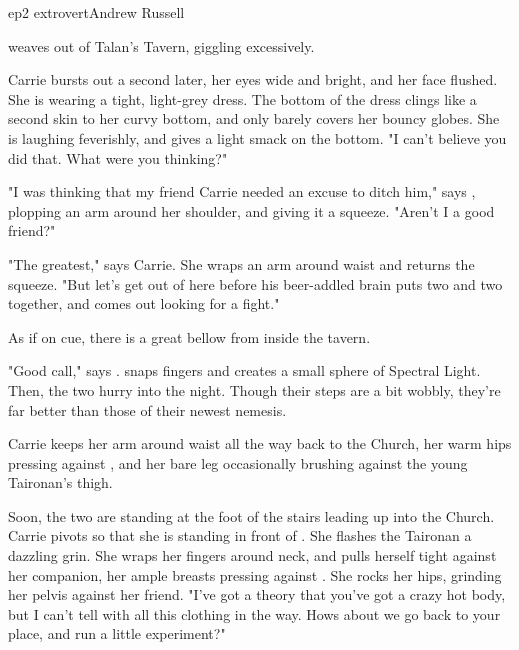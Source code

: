 \documentclass{book}
\begin{document}
\begin{childnode}{ep2 extrovert}{Andrew Russell}

    \name{} weaves out of Talan's Tavern, giggling excessively. 

    Carrie bursts out a second later, her eyes wide and bright, and her face flushed. She is wearing a tight, light-grey dress. The bottom of the dress clings like a second 
    skin to her curvy bottom, and only barely covers her bouncy globes. She is laughing feverishly, and gives \name{} a light smack on the bottom. "I can't believe you did that. What were you thinking?"

    "I was thinking that my friend Carrie needed an excuse to ditch him," says \name{}, plopping an arm around her shoulder, and giving it a squeeze. "Aren't I a good friend?"

    "The greatest," says Carrie. She wraps an arm around \names{} waist and returns the squeeze. "But let's get out of here before his beer-addled brain puts two and two together, and comes out 
    looking for a fight."

    As if on cue, there is a great bellow from inside the tavern.

    "Good call," says \name{}. \HeShe{} snaps \hisher{} fingers and creates a small sphere of Spectral Light.  Then, the two hurry into the night. Though their steps are a bit wobbly, they're far
    better than those of their newest nemesis.

    Carrie keeps her arm around \names{} waist all the way back to the Church, her warm hips pressing against \names{}, and her bare leg occasionally brushing against the young Taironan's
     thigh.

    Soon, the two are standing at the foot of the stairs leading up into the Church. Carrie pivots so that she is standing in front of \name{}. She flashes the Taironan a dazzling grin. She wraps her
    fingers around \names{} neck, and pulls herself tight against her companion, her ample breasts pressing against \names{}
    . She rocks her hips, grinding her pelvis against her friend. "I've got a theory that you've got a crazy hot body, but I can't tell with all this clothing
     in the way. Hows about we go back to your place, and run a little experiment?"


\end{childnode}
\end{document}

